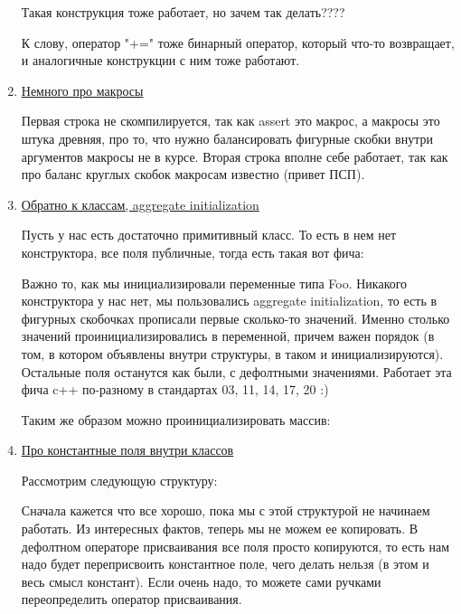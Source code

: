 \documentclass[a5paper]{article}
\begin{document}
\begin{enumerate}
	\par \quad Такая конструкция тоже работает, но зачем так делать????    
		
	\par \quad К слову, оператор "+=" тоже бинарный оператор, который что-то возвращает,
	 и аналогичные конструкции с ним тоже работают.
    
    \par \quad
    \item \underline{Немного про макросы}
	
	Первая строка не скомпилируется, так как assert это макрос, а макросы это штука древняя, про то, что нужно балансировать фигурные скобки внутри аргументов макросы не в курсе. Вторая строка вполне себе работает, так как про баланс круглых скобок макросам известно (привет ПСП).    
	\par \quad
    \item \underline{Обратно к классам, aggregate initialization}
    \par \quad Пусть у нас есть достаточно примитивный класс. То есть в нем нет конструктора, все поля публичные, тогда есть такая вот фича:
    
    

    \par \quad Важно то, как мы инициализировали переменные типа Foo. Никакого конструктора у нас нет, мы пользовались aggregate initialization, то есть в фигурных скобочках прописали первые сколько-то значений. Именно столько значений проинициализировались в переменной, причем важен порядок (в том, в котором объявлены внутри структуры, в таком и инициализируются). Остальные поля останутся как были, с дефолтными значениями. Работает эта фича c++ по-разному в стандартах 03, 11, 14, 17, 20 :)
    \par \quad Таким же образом можно проинициализировать массив:

    

    \par \quad
    \item \underline{Про константные поля внутри классов}
    \par \quad  Рассмотрим следующую структуру:

    

    \par \quad Сначала кажется что все хорошо, пока мы с этой структурой не начинаем работать. Из интересных фактов, теперь мы не можем ее копировать. В дефолтном операторе присваивания все поля просто копируются, то есть нам надо будет переприсвоить константное поле, чего делать нельзя (в этом и весь смысл констант). Если очень надо, то можете сами ручками переопределить оператор присваивания.
    	

\end{enumerate}
\end{document}
